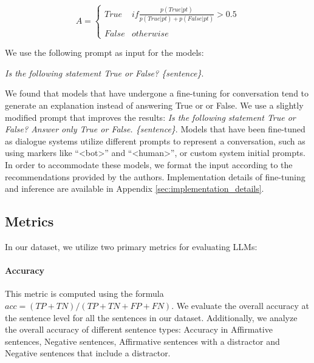 \documentclass[11pt]{article}
\begin{document}
$$
A=\left\{\begin{matrix}
True&if \frac{p(True|pt)}{p(True|pt)+p(False|pt)} > 0.5\\ 
\\
False&otherwise
\end{matrix}\right.
$$


We use the following prompt as input for the models: \begin{center}
    \textit{Is the following statement True or False? \{sentence\}}. 
\end{center}
We found that models that have undergone a fine-tuning for conversation tend to generate an explanation instead of answering True or or False. We use a slightly modified prompt that improves the results: \textit{Is the following statement True or False? Answer only True or False. \{sentence\}}. Models that have been fine-tuned as dialogue systems utilize different prompts to represent a conversation, such as using markers like ``<bot>'' and ``<human>'', or custom system initial prompts. In order to accommodate these models, we format the input according to the recommendations provided by the authors. Implementation details of fine-tuning and inference are available in Appendix \ref{sec:implementation_details}.

\subsection{Metrics}

In our dataset, we utilize two primary metrics for evaluating LLMs:

\paragraph{Accuracy} This metric is computed using the formula $acc = (TP + TN) / (TP + TN + FP + FN)$. We evaluate the overall accuracy at the sentence level for all the sentences in our dataset. Additionally, we analyze the overall accuracy of different sentence types: Accuracy in Affirmative sentences, Negative sentences, Affirmative sentences with a distractor and Negative sentences that include a distractor.



\end{document}
